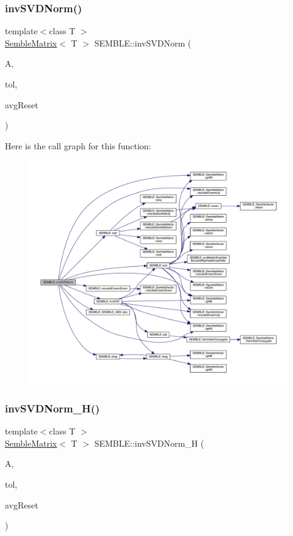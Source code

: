 \subsubsection{\texorpdfstring{invSVDNorm()}{invSVDNorm()}}
{\footnotesize\ttfamily template$<$class T $>$ \\
\mbox{\hyperlink{structSEMBLE_1_1SembleMatrix}{Semble\+Matrix}}$<$ T $>$ S\+E\+M\+B\+L\+E\+::inv\+S\+V\+D\+Norm (\begin{DoxyParamCaption}\item[{const \mbox{\hyperlink{structSEMBLE_1_1SembleMatrix}{Semble\+Matrix}}$<$ T $>$ \&}]{A,  }\item[{const double}]{tol,  }\item[{double \&}]{avg\+Reset }\end{DoxyParamCaption})}

Here is the call graph for this function\+:
\nopagebreak
\begin{figure}[H]
\begin{center}
\leavevmode
\includegraphics[width=350pt]{d7/dfd/namespaceSEMBLE_a659cbbc5cfef77a1dcf4dbbeb8edab57_cgraph}
\end{center}
\end{figure}
\mbox{\label{namespaceSEMBLE_a952949666873f95d18fdb968c4453f3b}} 
\subsubsection{\texorpdfstring{invSVDNorm\_H()}{invSVDNorm\_H()}}
{\footnotesize\ttfamily template$<$class T $>$ \\
\mbox{\hyperlink{structSEMBLE_1_1SembleMatrix}{Semble\+Matrix}}$<$ T $>$ S\+E\+M\+B\+L\+E\+::inv\+S\+V\+D\+Norm\+\_\+H (\begin{DoxyParamCaption}\item[{const \mbox{\hyperlink{structSEMBLE_1_1SembleMatrix}{Semble\+Matrix}}$<$ T $>$ \&}]{A,  }\item[{const double}]{tol,  }\item[{double \&}]{avg\+Reset }\end{DoxyParamCaption})}

